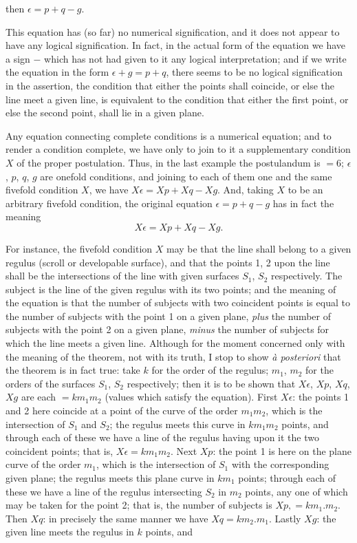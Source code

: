 \documentclass[11pt,a4paper,english]{article}
\theoremstyle{plain}
\begin{document}
\hspace*{2em} then $\epsilon = p + q - g$.

This equation has (so far) no numerical signification, and it does not appear to have any logical signification. In fact, in the actual form of the equation we have a sign $-$ which has not had given to it any logical interpretation; and if we write the equation in the form $\epsilon + g = p + q$, there seems to be no logical signification in the assertion, the condition that either the points shall coincide, or else the line meet a given line, is equivalent to the condition that either the first point, or else the second point, shall lie in a given plane.

Any equation connecting complete conditions is a numerical equation; and to render a condition complete, we have only to join to it a supplementary condition $X$ of the proper postulation. Thus, in the last example the postulandum is $= 6$; $\epsilon$, $p$, $q$, $g$ are onefold conditions, and joining to each of them one and the same fivefold condition $X$, we have $X\epsilon = Xp + Xq - Xg$. And, taking $X$ to be an arbitrary fivefold condition, the original equation $\epsilon = p + q - g$ has in fact the meaning
\[
X\epsilon = Xp + Xq - Xg.
\]

For instance, the fivefold condition $X$ may be that the line shall belong to a given regulus (scroll or developable surface), and that the points 1, 2 upon the line shall be the intersections of the line with given surfaces $S_1$, $S_2$ respectively. The subject is the line of the given regulus with its two points; and the meaning of the equation is that the number of subjects with two coincident points is equal to the number of subjects with the point 1 on a given plane, \textit{plus} the number of subjects with the point 2 on a given plane, \textit{minus} the number of subjects for which the line meets a given line. Although for the moment concerned only with the meaning of the theorem, not with its truth, I stop to show \textit{\`{a} posteriori} that the theorem is in fact true: take $k$ for the order of the regulus; $m_1$, $m_2$ for the orders of the surfaces $S_1$, $S_2$ respectively; then it is to be shown that $X\epsilon$, $Xp$, $Xq$, $Xg$ are each $= km_1m_2$ (values which satisfy the equation). First $X\epsilon$: the points 1 and 2 here coincide at a point of the curve of the order $m_1m_2$, which is the intersection of $S_1$ and $S_2$; the regulus meets this curve in $km_1m_2$ points, and through each of these we have a line of the regulus having upon it the two coincident points; that is, $X\epsilon = km_1m_2$. Next $Xp$: the point 1 is here on the plane curve of the order $m_1$, which is the intersection of $S_1$ with the corresponding given plane; the regulus meets this plane curve in $km_1$ points; through each of these we have a line of the regulus intersecting $S_2$ in $m_2$ points, any one of which may be taken for the point 2; that is, the number of subjects is $Xp, = km_1.m_2$. Then $Xq$: in precisely the same manner we have $Xq = km_2.m_1$. Lastly $Xg$: the given line meets the regulus in $k$ points, and
\end{document}
